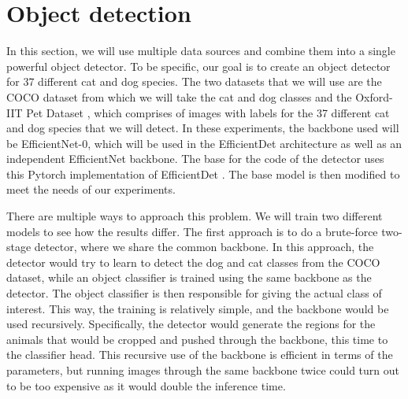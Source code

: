 \section{Object detection}
In this section, we will use multiple data sources and combine them into a single powerful object detector.
To be specific, our goal is to create an object detector for 37 different cat and dog species.
The two datasets that we will use are the COCO dataset \citep{COCO} from which we will take the cat and dog classes and the Oxford-IIT Pet Dataset \citep{catsdogs}, which comprises of images with labels for the 37 different cat and dog species that we will detect.
In these experiments, the backbone used will be EfficientNet-0, which will be used in the EfficientDet architecture as well as an independent EfficientNet backbone.
The base for the code of the detector uses this Pytorch implementation of EfficientDet \citep{pytorch-efficientdet}.
The base model is then modified to meet the needs of our experiments.

There are multiple ways to approach this problem.
We will train two different models to see how the results differ.
The first approach is to do a brute-force two-stage detector, where we share the common backbone.
In this approach, the detector would try to learn to detect the dog and cat classes from the COCO dataset, while an object classifier is trained using the same backbone as the detector.
The object classifier is then responsible for giving the actual class of interest.
This way, the training is relatively simple, and the backbone would be used recursively.
Specifically, the detector would generate the regions for the animals that would be cropped and pushed through the backbone, this time to the classifier head.
This recursive use of the backbone is efficient in terms of the parameters, but running images through the same backbone twice could turn out to be too expensive as it would double the inference time.

